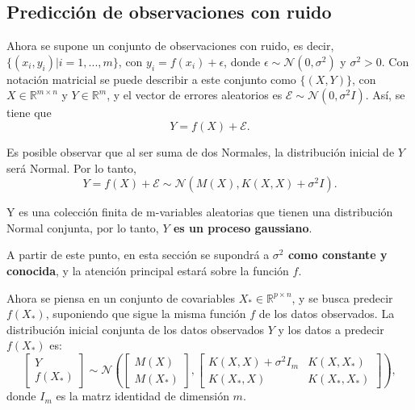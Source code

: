 \subsection{Predicción de observaciones con ruido}

Ahora se supone un conjunto de observaciones con ruido, es decir, $\{(x_i,y_i)|i=1,...,m \}$, con $y_i=f(x_i) + \epsilon$, donde $\epsilon \sim \mathcal{N}(0,\sigma^2)$ y $\sigma^2 > 0$. Con notación matricial se puede describir a este conjunto como $\{(X,Y)\}$, con $X \in \mathbb{R}^{m \times n}$ y $Y \in \mathbb{R}^{m}$, y el vector de errores aleatorios es $\mathcal{E} \sim \mathcal{N}(0,\sigma^2I)$. Así, se tiene que
\begin{equation*}
    Y = f(X) + \mathcal{E}.
\end{equation*}

Es posible observar que al ser suma de dos Normales, la distribuci\'on inicial de $Y$ ser\'a Normal. Por lo tanto, 
\begin{equation*}
    Y = f(X) + \mathcal{E} \sim \mathcal{N}(M(X), K(X,X) + \sigma^2I).
\end{equation*}

\begin{obs}
    Y es una colección finita de m-variables aleatorias que tienen una distribuci\'on Normal conjunta, por lo tanto, \textbf{$Y$ es un proceso gaussiano}.
\end{obs}

A partir de este punto, en esta sección se supondrá a \textbf{$\sigma^2$ como constante y conocida}, y la atención principal estará sobre la función $f$.

Ahora se piensa en un conjunto de covariables $X_* \in \mathbb{R}^{p \times n}$, y se busca predecir $f(X_*)$, suponiendo que sigue la misma función $f$ de los datos observados. La distribución inicial conjunta de los datos observados $Y$ y los datos a predecir $f(X_*)$ es: 
\begin{equation*}
    \left[
        \begin{array}{c}
        Y \\
        f(X_*)
        \end{array}
    \right]  
    \sim \mathcal{N}  
    \left(
        \left[
            \begin{array}{c} 
            M(X) \\ 
            M(X_*) 
            \end{array}
        \right],
        \left[
            \begin{array}{cc}
            K(X,X) + \sigma^2 I_{m} & K(X,X_*)  \\
            K(X_*,X) & K(X_*,X_*)
            \end{array}
        \right]
    \right), 
\end{equation*}
donde $I_m$ es la matrz identidad de dimensi\'on $m$.

